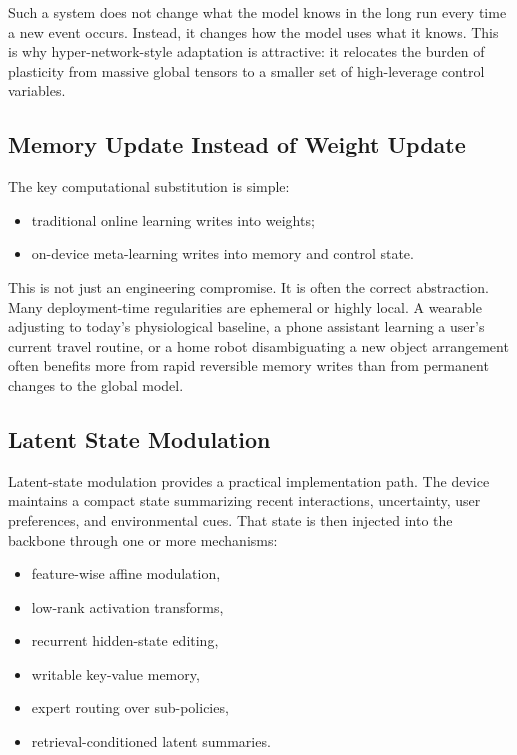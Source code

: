 \documentclass[11pt,a4paper]{article}
\begin{document}
Such a system does not change what the model knows in the long run every time a new event occurs. Instead, it changes how the model uses what it knows. This is why hyper-network-style adaptation is attractive: it relocates the burden of plasticity from massive global tensors to a smaller set of high-leverage control variables.

\subsection{Memory Update Instead of Weight Update}

The key computational substitution is simple:
\begin{itemize}[noitemsep]
    \item traditional online learning writes into weights;
    \item on-device meta-learning writes into memory and control state.
\end{itemize}

This is not just an engineering compromise. It is often the correct abstraction. Many deployment-time regularities are ephemeral or highly local. A wearable adjusting to today's physiological baseline, a phone assistant learning a user's current travel routine, or a home robot disambiguating a new object arrangement often benefits more from rapid reversible memory writes than from permanent changes to the global model.

\subsection{Latent State Modulation}

Latent-state modulation provides a practical implementation path. The device maintains a compact state summarizing recent interactions, uncertainty, user preferences, and environmental cues. That state is then injected into the backbone through one or more mechanisms:
\begin{itemize}[noitemsep]
    \item feature-wise affine modulation,
    \item low-rank activation transforms,
    \item recurrent hidden-state editing,
    \item writable key-value memory,
    \item expert routing over sub-policies,
    \item retrieval-conditioned latent summaries.
\end{itemize}
\end{document}
